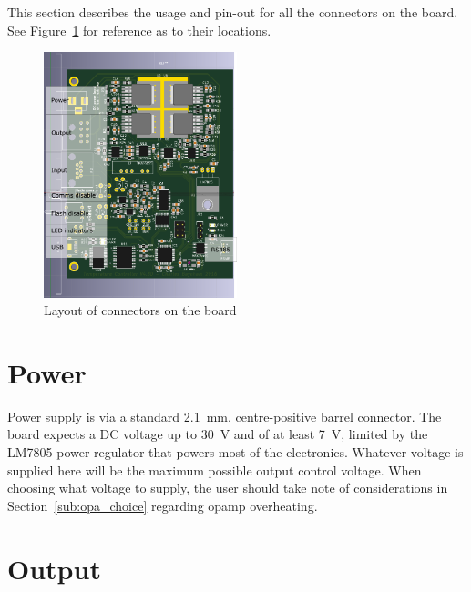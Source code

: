 \documentclass[11pt]{report}
\begin{document}
This section describes the usage and pin-out for all the connectors on the board. See Figure~\ref{fig:connectors} for reference as to their locations. 

\begin{figure}[h!]
	\centering
	\includegraphics[width=0.5\textwidth]{BoardLabelled/Labelled}
	\caption{Layout of connectors on the board}
	\label{fig:connectors}
\end{figure}

\section{Power}

Power supply is via a standard \SI{2.1}{mm}, centre-positive barrel connector. The board expects a DC voltage up to \SI{30}{\volt} and of at least \SI{7}{\volt}, limited by the LM7805 power regulator that powers most of the electronics. Whatever voltage is supplied here will be the maximum possible output control voltage. When choosing what voltage to supply, the user should take note of considerations in Section~\ref{sub:opa_choice} regarding opamp overheating. 

\section{Output}
\end{document}
